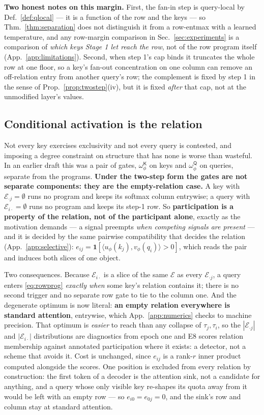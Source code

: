 \documentclass{article}
\newcommand{\omK}{\omega^{\mathsf{K}}_\phi}
\newcommand{\omQ}{\omega^{\mathsf{Q}}_\phi}
\begin{document}
\textbf{Two honest notes on this margin.} First, the fan-in step is query-local by
Def.~\ref{def:qlocal} --- it is a function of the row and the keys --- so Thm.~\ref{thm:separation}
does not distinguish it from a row-entmax with a learned temperature, and any row-margin
comparison in Sec.~\ref{sec:experiments} is a comparison of \emph{which keys Stage 1 let reach
the row}, not of the row program itself (App.~\ref{app:limitations}). Second, when step 1's cap
binds it truncates the whole row at one floor, so a key's fan-out concentration on one column can
remove an off-relation entry from another query's row; the complement is fixed by step 1 in the
sense of Prop.~\ref{prop:twostep}(iv), but it is fixed \emph{after} that cap, not at the
unmodified layer's values.

\subsection{Conditional activation is the relation}
\label{sec:method-gate}
Not every key exercises exclusivity and not every query is contested, and imposing a degree
constraint on structure that has none is worse than wasteful. In an earlier draft this was a pair
of gates, $\omK$ on keys and $\omQ$ on queries, separate from the programs. \textbf{Under the
two-step form the gates are not separate components: they are the empty-relation case.} A key
with $\mathcal{E}_{\cdot j}=\emptyset$ runs no program and keeps its softmax column entrywise; a
query with $\mathcal{E}_{i\cdot}=\emptyset$ runs no program and keeps its step-1 row. So
\textbf{participation is a property of the relation, not of the participant alone}, exactly as
the motivation demands --- a signal preempts \emph{when competing signals are present} --- and it
is decided by the same pairwise compatibility that decides the relation
(App.~\ref{app:selective}): $e_{ij}=\mathbf{1}[\langle u_\phi(k_j),v_\phi(q_i)\rangle>0]$,
which reads the pair and induces both slices of one object.

Two consequences. Because $\mathcal{E}_{i\cdot}$ is a slice of the same $\mathcal{E}$ as every
$\mathcal{E}_{\cdot j}$, a query enters \eqref{eq:rowprog} \emph{exactly when} some key's
relation contains it; there is no second trigger and no separate row gate to tie to the column
one. And the degenerate optimum is now literal: \textbf{an empty relation everywhere is standard
attention}, entrywise, which App.~\ref{app:numerics} checks to machine precision. That optimum
is \emph{easier} to reach than any collapse of $\tau_j,\tau_i$, so the $|\mathcal{E}_{\cdot j}|$
and $|\mathcal{E}_{i\cdot}|$ distributions are diagnostics from epoch one and E8 scores relation
membership against annotated participation where it exists: a detector, not a scheme that avoids
it. Cost is unchanged, since $e_{ij}$ is a rank-$r$ inner product computed alongside the scores.
One position is excluded from every relation by construction: the first token of a decoder is
the attention sink, not a candidate for anything, and a query whose only visible key re-shapes
its quota away from it would be left with an empty row --- so $e_{i0}=e_{0j}=0$, and the sink's
row and column stay at standard attention.
\end{document}
